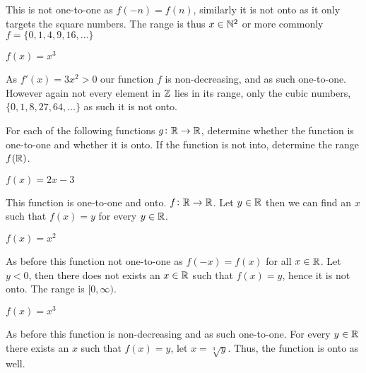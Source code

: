 \documentclass[a4paper, english, 12pt]{article} %
\begin{document}
\begin{answer}
  This is not one-to-one as $f(-n) = f(n)$, similarly it is not onto as it only
  targets the square numbers. The range is thus $x \in \mathbb{N}^2$ or more commonly $f
  = \{0,1,4,9,16,\ldots\}$ 
\end{answer}

\begin{subproblem}[6]
  $f(x) = x^3$
\end{subproblem}

\begin{answer}
  As $f'(x) = 3x^2 > 0$ our function $f$ is non-decreasing, and as
  such one-to-one. However again not every element in $\mathbb{Z}$ lies in its range,
  only the cubic numbers, $\{0,1,8,27,64,\ldots\}$ as such it is not onto. 
\end{answer}

\begin{problem}
  For each of the following functions $g \colon \mathbb{R} \to \mathbb{R}$, determine whether
  the function is one-to-one and whether it is onto. If the function is not
  into, determine the range $f(\mathbb{R})$.
\end{problem}

\begin{subproblem}[2]
  $f(x) = 2x - 3$
\end{subproblem}

\begin{answer}
  This function is one-to-one and onto. $f \colon \mathbb{R} \to \mathbb{R}$. Let $y \in \mathbb{R}$
  then we can find an $x$ such that $f(x) = y$ for every $y \in \mathbb{R}$.
\end{answer}

\begin{subproblem}[4]
  $f(x) = x^2$
\end{subproblem}

\begin{answer}
  As before this function not one-to-one as $f(-x)=f(x)$ for all $x \in \mathbb{R}$.
  Let $y<0$, then there does not exists an $x \in \mathbb{R}$ such that $f(x) = y$,
  hence it is not onto. The range is $[0,\infty)$.
\end{answer}

\begin{subproblem}[6]
  $f(x) = x^3$
\end{subproblem}

\begin{answer}
  As before this function is non-decreasing and as such one-to-one. For every $y
  \in \mathbb{R}$ there exists an $x$ such that $f(x) = y$, let $x = \sqrt[3]{y}$. Thus,
  the function is onto as well.
\end{answer}
\end{document}
